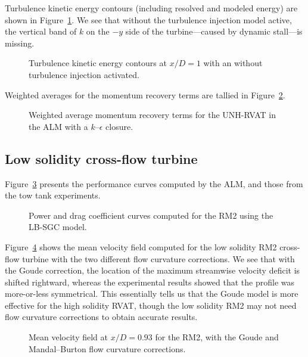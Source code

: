 Turbulence kinetic energy contours (including resolved and modeled energy) are
shown in Figure~\ref{fig:RVAT-ALM-kcont}. We see that without the turbulence
injection model active, the vertical band of $k$ on the $-y$ side of the
turbine---caused by dynamic stall---is missing.

\begin{figure}
    \caption{Turbulence kinetic energy contours at $x/D=1$ with an without
        turbulence injection activated.}
    
    \label{fig:RVAT-ALM-kcont}
\end{figure}

Weighted averages for the momentum recovery terms are tallied in
Figure~\ref{fig:RVAT-ALM-recovery}.

\begin{figure}
    \caption{Weighted average momentum recovery terms for the UNH-RVAT in the
        ALM with a $k$--$\epsilon$ closure.}
    
    \label{fig:RVAT-ALM-recovery}
\end{figure}


\subsection{Low solidity cross-flow turbine}

Figure~\ref{fig:RM2-ALM-perf-curves} presents the performance curves computed by
the ALM, and those from the tow tank experiments.

\begin{figure}
    \caption{Power and drag coefficient curves computed for the RM2 using the
        LB-SGC model.}
    
    \label{fig:RM2-ALM-perf-curves}
\end{figure}

Figure~\ref{fig:RM2-ALM-flow-curvature} shows the mean velocity field computed
for the low solidity RM2 cross-flow turbine with the two different flow
curvature corrections. We see that with the Goude correction, the location of
the maximum streamwise velocity deficit is shifted rightward, whereas the
experimental results showed that the profile was more-or-less symmetrical. This
essentially tells us that the Goude model is more effective for the high
solidity RVAT, though the low solidity RM2 may not need flow curvature
corrections to obtain accurate results.

\begin{figure}
    \caption{Mean velocity field at $x/D=0.93$ for the RM2, with the Goude and
        Mandal--Burton flow curvature corrections.}
    
    \label{fig:RM2-ALM-flow-curvature}
\end{figure}



